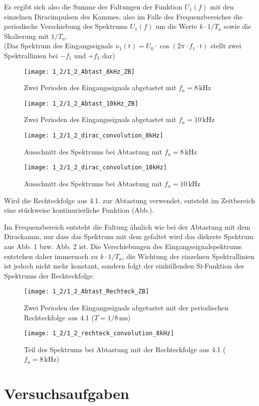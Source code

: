 \documentclass[a4paper, 12pt]{article}
\begin{document}
Es ergibt sich also die Summe der Faltungen der Funktion $U_1(f)$ mit den einzelnen
Diracimpulsen des Kammes, also im Falle des Frequenzbereiches die periodische Verschiebung
des Spektrums $U_1(f)$ um die Werte $k \cdot 1/T_a$ sowie die Skalierung mit
$1/T_a$.\\

(Das Spektrum des Eingangssignals $u_1(t) = U_0 \cdot \cos{(2 \pi \cdot
  f_1 \cdot t)}$ stellt zwei Spektrallinien bei $-f_1$ und $+f_1$ dar)




\begin{figure}[H]
	\texttt{[image: 1\_2/1\_2\_Abtast\_8kHz\_ZB]}
  \caption{Zwei Perioden des Eingangssignals abgetastet mit $f_a=8\,\si{\kilo\hertz}$}
\end{figure}

\begin{figure}[H]
	\texttt{[image: 1\_2/1\_2\_Abtast\_10kHz\_ZB]}
  \caption{Zwei Perioden des Eingangssignals abgetastet mit $f_a=10\,\si{\kilo\hertz}$}
\end{figure}

\begin{figure}[H]
	\texttt{[image: 1\_2/1\_2\_dirac\_convolution\_8kHz]}
  \caption{Ausschnitt des Spektrums bei Abtastung mit $f_a = 8 \, \si{\kilo\hertz}$}
\end{figure}

\begin{figure}[H]
	\texttt{[image: 1\_2/1\_2\_dirac\_convolution\_10kHz]}
  \caption{Ausschnitt des Spektrums bei Abtastung mit $f_a = 10 \, \si{\kilo\hertz}$}
\end{figure}

Wird die Rechteckfolge aus 4.1. zur Abtastung verwendet, entsteht im Zeitbereich
eine stückweise kontinurierliche Funktion (Abb.).

Im Frequenzbereich entsteht die Faltung ähnlich wie bei der Abtastung mit dem
Dirackamm, nur dass das Spektrum mit dem gefaltet wird das diskrete Spektrum aus
Abb. 1 bzw. Abb. 2 ist.
Die Verschiebungen des Eingangssignalspektrums entstehen daher immernoch zu $k
\cdot 1/T_a$, die Wichtung der einzelnen Spektrallinien
ist jedoch nicht mehr konstant, sondern folgt der einhüllenden Si-Funktion des
Spektrums der Rechteckfolge.

\begin{figure}[H]
	\texttt{[image: 1\_2/1\_2\_Abtast\_Rechteck\_ZB]}
  \caption{Zwei Perioden des Eingangssignals abgetastet mit der periodischen
    Rechteckfolge aus 4.1 ($T=1/8 \,\si{\milli\second}$)}
\end{figure}

\begin{figure}[H]
	\texttt{[image: 1\_2/1\_2\_rechteck\_convolution\_8kHz]}
  \caption{Teil des Spektrums bei Abtastung mit der Rechteckfolge aus 4.1 ($f_a = 8 \,\si{\kilo\hertz}$)}
\end{figure}


\section{Versuchsaufgaben}
\end{document}
